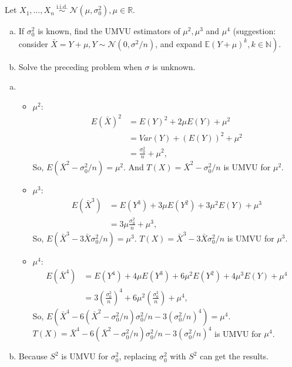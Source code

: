\begin{ex}
    Let \(X_{1}, \ldots, X_{n} \stackrel{\text { i.i.d. }}{\sim} \mathcal{N}\left(\mu, \sigma_{0}^{2}\right), \mu \in \mathbb{R}\). 
    \begin{enumerate}[(a)]
        \item If \(\sigma_{0}^{2}\) is known, find the UMVU estimators of \(\mu^{2}, \mu^{3}\) and \(\mu^{4}\) (suggestion: consider \(\bar{X}=Y+\mu, Y \sim \mathcal{N}\left(0, \sigma^{2} / n\right)\), and expand \(\left.\mathbb{E}(Y+\mu)^{k}, k \in \mathbb{N}\right)\). 
        \item Solve the preceding problem when \(\sigma\) is unknown. 
    \end{enumerate}
\end{ex}

\begin{solution}
    \begin{enumerate}[(a)]
        \item \begin{itemize}
            \item $\mu^2$: 
            \[
                \begin{aligned}
                    E(\bar{X})^2&=E(Y)^2+2\mu E(Y)+\mu^2\\
                    &=Var(Y)+(E(Y))^2+\mu^2\\
                    &=\frac{\sigma_0^2}{n}+\mu^2, 
                \end{aligned}
            \]
            So, $E(\bar{X}^2-\sigma_0^2/n)=\mu^2$. And $T(X)=\bar{X}^2-\sigma_0^2/n$ is UMVU for $\mu^2$. 
            \item $\mu^3$: 
            \[
                \begin{aligned}
                    E(\bar{X}^3)&=E(Y^3)+3\mu E(Y^2)+3\mu^2E(Y)+\mu^3\\
                    &=3\mu\frac{\sigma^2_0}{n}+\mu^3, 
                \end{aligned}
            \]
            So, $E(\bar{X}^3-3\bar{X}\sigma_0^2/n)=\mu^3$. $T(X)=\bar{X}^3-3\bar{X}\sigma_0^2/n$ is UMVU for $\mu^3$. 
            \item $\mu^4$: 
            \[
                \begin{aligned}
                    E(\bar{X}^4)&=E(Y^4)+4\mu E(Y^3)+6\mu^2E(Y^2)+4\mu^3E(Y)+\mu^4\\
                    &=3\left(\frac{\sigma_0^2}{n}\right)^4+6\mu^2\left(\frac{\sigma_0^2}{n}\right)+\mu^4, 
                \end{aligned}
            \]
            So, $E(\bar{X}^4-6(\bar{X}^2-\sigma_0^2/n)\sigma_0^2/n-3(\sigma_0^2/n)^4)=\mu^4$. $T(X)=\bar{X}^4-6(\bar{X}^2-\sigma_0^2/n)\sigma_0^2/n-3(\sigma_0^2/n)^4$ is UMVU for $\mu^4$. 
        \end{itemize}
        \item Because $S^2$ is UMVU for $\sigma_0^2$, replacing $\sigma_0^2$ with $S^2$ can get the results. 
    \end{enumerate}
\end{solution}

